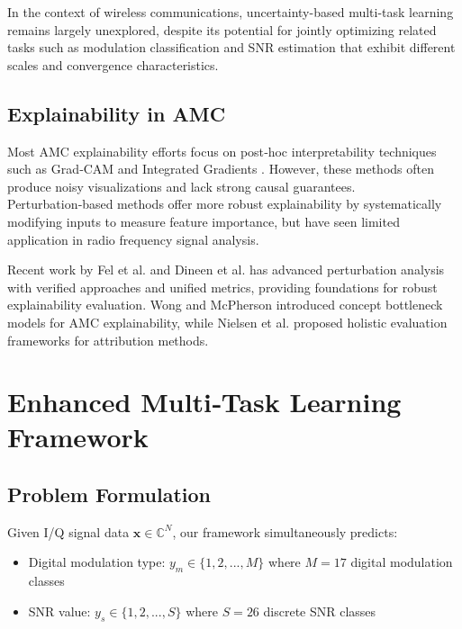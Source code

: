 \documentclass{ELSP}
\begin{document}
In the context of wireless communications, uncertainty-based multi-task learning remains largely unexplored, despite its potential for jointly optimizing related tasks such as modulation classification and SNR estimation that exhibit different scales and convergence characteristics.

\subsection{Explainability in AMC}
Most AMC explainability efforts focus on post‑hoc interpretability techniques such as Grad‑CAM \cite{selvaraju2017grad} and Integrated Gradients \cite{sundararajan2017axiomatic}. However, these methods often produce noisy visualizations and lack strong causal guarantees. Perturbation‑based methods \cite{fong2017interpretable,IVANOVS2021228,robnik2018perturbation} offer more robust explainability by systematically modifying inputs to measure feature importance, but have seen limited application in radio frequency signal analysis.

Recent work by Fel et al. \cite{fel2023don} and Dineen et al. \cite{dineen2024unified} has advanced perturbation analysis with verified approaches and unified metrics, providing foundations for robust explainability evaluation. Wong and McPherson \cite{wong2021explainable} introduced concept bottleneck models for AMC explainability, while Nielsen et al. \cite{nielsen2023evalattai} proposed holistic evaluation frameworks for attribution methods.

\section{Enhanced Multi‑Task Learning Framework}

\subsection{Problem Formulation}

Given I/Q signal data $\mathbf{x} \in \mathbb{C}^N$, our framework simultaneously predicts:
\begin{itemize}
\item Digital modulation type: $y_m \in \{1, 2, ..., M\}$ where $M=17$ digital modulation classes
\item SNR value: $y_s \in \{1, 2, ..., S\}$ where $S=26$ discrete SNR classes
\end{itemize}
\end{document}
